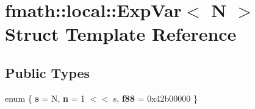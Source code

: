 \hypertarget{structfmath_1_1local_1_1ExpVar}{\section{fmath\-:\-:local\-:\-:Exp\-Var$<$ N $>$ Struct Template Reference}
\label{structfmath_1_1local_1_1ExpVar}
}
\subsection*{Public Types}
\begin{DoxyCompactItemize}
\item 
enum \{ {\bfseries s} =  N, 
{\bfseries n} =  1 $<$$<$ s, 
{\bfseries f88} =  0x42b00000
 \}
\end{DoxyCompactItemize}

